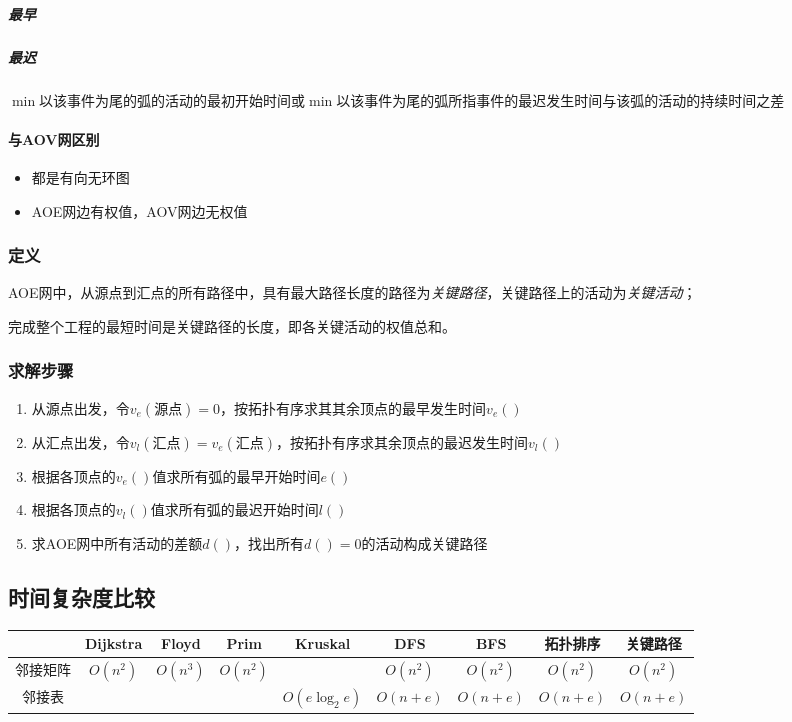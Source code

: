 \subparagraph{最早}

\subparagraph{最迟}
\(\min\){以该事件为尾的弧的活动的最初开始时间}或\(\min\){以该事件为尾的弧所指事件的最迟发生时间与该弧的活动的持续时间之差}


\paragraph{与AOV网区别}
\begin{itemize}
    \item 都是有向无环图
    \item AOE网边有权值，AOV网边无权值
\end{itemize}


\subsubsection{定义}
AOE网中，从源点到汇点的所有路径中，具有最大路径长度的路径为\textit{关键路径}，关键路径上的活动为\textit{关键活动}；

完成整个工程的最短时间是关键路径的长度，即各关键活动的权值总和。

\subsubsection{求解步骤}
\begin{enumerate}
    \item 从源点出发，令\(v_e(\text{源点}) = 0\)，按拓扑有序求其其余顶点的最早发生时间\(v_e()\)
    \item 从汇点出发，令\(v_l(\text{汇点}) = v_e(\text{汇点})\)，按拓扑有序求其余顶点的最迟发生时间\(v_l()\)
    \item 根据各顶点的\(v_e()\)值求所有弧的最早开始时间\(e()\)
    \item 根据各顶点的\(v_l()\)值求所有弧的最迟开始时间\(l()\)
    \item 求AOE网中所有活动的差额\(d()\)，找出所有\(d() = 0\)的活动构成关键路径
\end{enumerate}


\subsection{时间复杂度比较}
\begin{center}
    \begin{tabular}{c|c|c|c|c|c|c|c|c}
         & Dijkstra & Floyd & Prim & Kruskal & DFS & BFS & 拓扑排序 & 关键路径 \\ 
        \hline
        邻接矩阵 & \(O(n^2)\) & \(O(n^3)\) & \(O(n^2)\) & & \(O(n ^2)\) & \(O(n^2)\) & \(O(n^2)\) & \(O(n^2)\) \\ 
        \hline
        邻接表 & & & & \(O(e\log_2e)\) & \(O(n + e)\) & \(O(n + e)\) & \(O(n + e)\) & \(O(n + e)\)
    \end{tabular}
\end{center}



